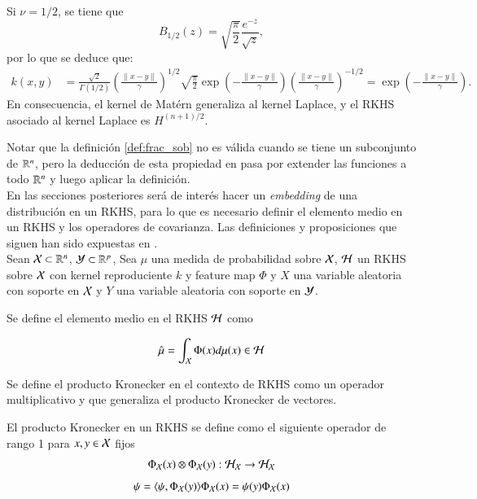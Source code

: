 \begin{obs}
    Si \( \nu = 1/2 \), se tiene que
\[
B_{1/2} (z) = \sqrt{ \frac{\pi}{2} } \frac{e^{-z}}{\sqrt{z}},
\]
por lo que se deduce que:
\[
\begin{aligned}
k (x,y) &= \frac{\sqrt{2}}{\Gamma(1/2)} \left(  \frac{\|x-y\|}{\gamma} \right)^{1/2} \sqrt{ \frac{\pi}{2} } \exp \left( -\frac{\|x-y\|}{\gamma} \right) \left(  \frac{\|x-y\|}{\gamma} \right)^{-1/2} = \exp \left( -\frac{\|x-y\|}{\gamma} \right).
\end{aligned}
\]
En consecuencia, el kernel de Matérn generaliza al kernel Laplace, y el RKHS asociado al kernel Laplace es \( H^{(n+1)/2} \).
\end{obs}
Notar que la definición \ref{def:frac_sob} no es válida cuando se tiene un subconjunto de $\mathbb{R}^n$, pero la deducción de esta propiedad en \cite{Wendland2004ScatteredApproximation} pasa por extender las funciones a todo $\mathbb{R}^n$ y luego aplicar la definición. \\
En las secciones posteriores será de interés hacer un \textit{embedding} de una distribución en un RKHS, para lo que es necesario definir el elemento medio en un RKHS y los operadores de covarianza. Las definiciones y proposiciones que siguen han sido expuestas en \cite{Fukumizu2004DimensionalitySpaces, Song2009HilbertSystems, Muandet2017KernelBeyond}. \\
Sean $\mathcal{X} \subset \mathbb{R}^n$, $\mathcal{Y} \subset \mathbb{R}^p$,  Sea $\mu$ una medida de probabilidad sobre $\mathcal{X}$, $\mathcal{H}$ un RKHS sobre $\mathcal{X}$ con kernel reproduciente $k$ y feature map $\Phi$ y $X$ una variable aleatoria con soporte en $\mathcal{X}$ y $Y$ una variable aleatoria con soporte en $\mathcal{Y}$.
\begin{defn}
	Se define el elemento medio en el RKHS $\mathcal{H}$ como
	
	\begin{equation*}
		\hat \mu = \int_{\mathcal{X}} \Phi (x) d \mu (x) \in \mathcal{H}
	\end{equation*}
\end{defn}
Se define el producto Kronecker en el contexto de RKHS como un operador multiplicativo y que generaliza el producto Kronecker de vectores.
\begin{defn}
    El producto Kronecker en un RKHS se define como
    el siguiente operador de rango 1 para $x, y \in \mathcal{X}$ fijos
	$$ \Phi_{\mathcal{X}} (x) \otimes \Phi_{\mathcal{X}}(y) : \mathcal{H}_{\mathcal{X}} \to \mathcal{H}_{\mathcal{X}}$$
	\begin{equation*}
		[\Phi_\X (x) \otimes \Phi_\X(y)] \psi = \langle \psi, \Phi_\X (y) \rangle \Phi_\X (x) = \psi (y) \Phi_\X (x)
	\end{equation*}
    \label{def:kronecker}
\end{defn}
